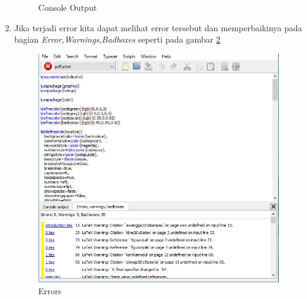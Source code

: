\begin{enumerate}
\begin{figure}[!htbp]
  \caption{Console Output}\label{fig:cnpt}
\end{figure}
\item Jika terjadi error kita dapat melihat error tersebut dan memperbaikinya pada bagian \textit{Error,Warnings,Badboxes} seperti pada gambar \ref{fig:error}
\begin{figure}[!htbp]
  \centering
  \includegraphics[width=.75\textwidth]{figures/error.JPG}
  \caption{Errors}\label{fig:error}
\end{figure}
\end{enumerate}